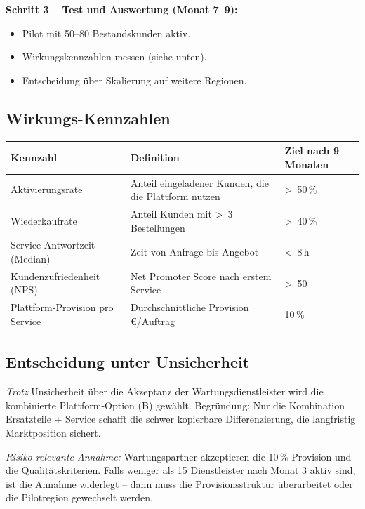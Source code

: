 \documentclass[11pt,a4paper,oneside]{article}
\begin{document}
\textbf{Schritt 3 -- Test und Auswertung (Monat 7--9):}
\begin{itemize}
  \item Pilot mit 50--80 Bestandskunden aktiv.
  \item Wirkungskennzahlen messen (siehe unten).
  \item Entscheidung über Skalierung auf weitere Regionen.
\end{itemize}

\subsection{Wirkungs-Kennzahlen}

\begin{tabularx}{\linewidth}{@{}lXl@{}}
\toprule
\textbf{Kennzahl}                & \textbf{Definition}                              & \textbf{Ziel nach 9 Monaten} \\
\midrule
Aktivierungsrate                & Anteil eingeladener Kunden, die die Plattform nutzen & \textgreater~50\,\% \\
Wiederkaufrate                  & Anteil Kunden mit \textgreater~3 Bestellungen     & \textgreater~40\,\% \\
Service-Antwortzeit (Median)    & Zeit von Anfrage bis Angebot                       & \textless~8\,h \\
Kundenzufriedenheit (NPS)       & Net Promoter Score nach erstem Service             & \textgreater~50 \\
Plattform-Provision pro Service & Durchschnittliche Provision \euro{}/Auftrag       & 10\,\% \\
\bottomrule
\end{tabularx}

\subsection{Entscheidung unter Unsicherheit}

\emph{Trotz} Unsicherheit über die Akzeptanz der Wartungsdienstleister wird die kombinierte Plattform-Option (B) gewählt. Begründung: Nur die Kombination Ersatzteile + Service schafft die schwer kopierbare Differenzierung, die langfristig Marktposition sichert.

\emph{Risiko-relevante Annahme:} Wartungspartner akzeptieren die 10\,\%-Provision und die Qualitätskriterien. Falls weniger als 15 Dienstleister nach Monat 3 aktiv sind, ist die Annahme widerlegt -- dann muss die Provisionsstruktur überarbeitet oder die Pilotregion gewechselt werden.
\end{document}
